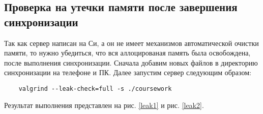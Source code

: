 
\subsection{Проверка на утечки памяти после завершения синхронизации}
Так как сервер написан на Си, а он не имеет механизмов автоматической очистки памяти, то нужно убедиться, что вся аллоцированая память была освобождена, после выполнения синхронизации. Сначала добавим новых файлов в директорию синхронизации на телефоне и ПК. Далее запустим сервер следующим образом:
\begin{verbatim}
	valgrind --leak-check=full -s ./coursework
\end{verbatim} 
Результат выполнения представлен на рис. \ref{leak1} и рис. \ref{leak2}. 

